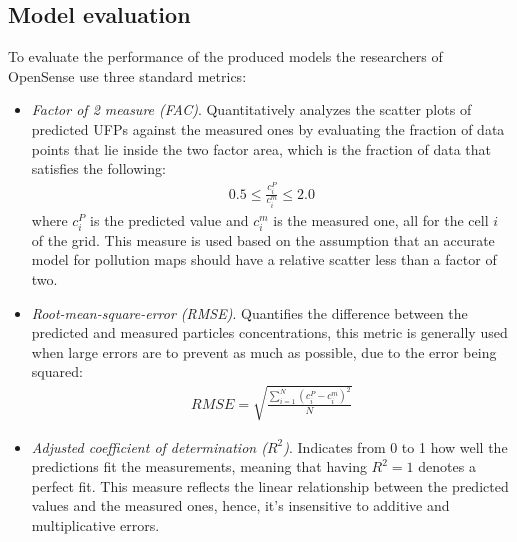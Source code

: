 \documentclass[11pt,a4paper,titlepage]{book}
\begin{document}
\subsection{Model evaluation}
To evaluate the performance of the produced models the researchers of OpenSense use three standard metrics:
\begin{itemize}
    \item \textit{Factor of 2 measure (FAC)}. Quantitatively analyzes the scatter plots of predicted UFPs against the measured ones by evaluating the fraction of data points that lie inside the two factor area, which is the fraction of data that satisfies the following:
    \begin{align}
        0.5 \le \frac{c_i^P}{c_i^m} \le 2.0
    \end{align}
    where $c_i^P$ is the predicted value and $c_i^m$ is the measured one, all for the cell $i$ of the grid. This measure is used based on the assumption that an accurate model for pollution maps should have a relative scatter less than a factor of two. \cite{air-quality-evaluation}
    \item \textit{Root-mean-square-error (RMSE)}. Quantifies the difference between the predicted and measured particles concentrations, this metric is generally used when large errors are to prevent as much as possible, due to the error being squared:
    \begin{align}
        RMSE=\sqrt{\frac{\sum_{i=1}^N (c_i^P - c_i^m)^2}{N}}
    \end{align}
    \item \textit{Adjusted coefficient of determination ($R^2$)}. Indicates from 0 to 1 how well the predictions fit the measurements, meaning that having $R^2=1$ denotes a perfect fit. This measure reflects the linear relationship between the predicted values and the measured ones, hence, it's insensitive to additive and multiplicative errors.
\end{itemize}
\end{document}
